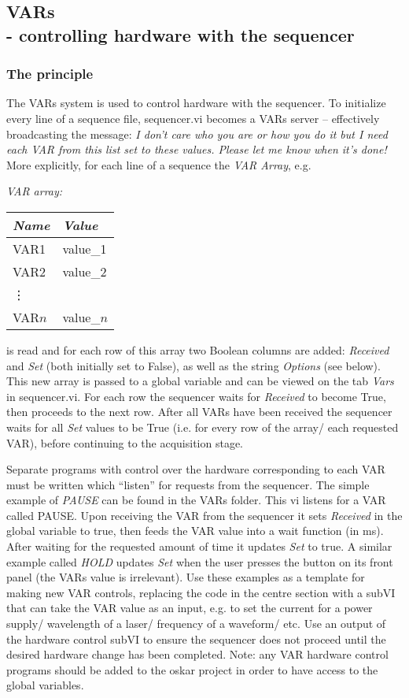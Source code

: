 \documentclass[10pt,a4paper]{article}
\begin{document}
\subsection[VARs]{\label{sex:var}VARs \\ %
	\normalsize - controlling hardware with the sequencer}

\subsubsection{The principle}
The VARs system is used to control hardware with the sequencer.  To initialize every line of a sequence file, sequencer.vi becomes a VARs server -- effectively broadcasting the message: \emph{I don't care who you are or how you do it but I need each VAR from this list set to these values. Please let me know when it's done!}  More explicitly, for each line of a sequence the \emph{VAR Array}, e.g.

\hangindent=0.7cm
\emph{VAR array:} \\
\begin{tabularx}{0.3\textwidth}{X|X}
	\emph{Name} & \emph{Value} \\
	\hline
	VAR1 & value\_1 \\
	VAR2 & value\_2 \\
	\vdots & \\
	VAR$n$ & value\_$n$ \\
\end{tabularx}

\noindent is read and for each row of this array two Boolean columns are added: \emph{Received} and \emph{Set} (both initially set to False), as well as the string \emph{Options} (see below).  This new array is passed to a global variable and can be viewed on the tab \emph{Vars} in sequencer.vi.  For each row the sequencer waits for \emph{Received} to become True, then proceeds to the next row. After all VARs have been received the sequencer waits for all \emph{Set} values to be True (i.e. for every row of the array/ each requested VAR), before continuing to the acquisition stage.

Separate programs with control over the hardware corresponding to each VAR must be written which ``listen'' for requests from the sequencer.  The simple example of \emph{PAUSE} can be found in the VARs folder.  This vi listens for a VAR called PAUSE. Upon receiving the VAR from the sequencer it sets \emph{Received} in the global variable to true, then feeds the VAR value into a wait function (in ms). After waiting for the requested amount of time it updates \emph{Set} to true.  A similar example called \emph{HOLD} updates \emph{Set} when the user presses the button on its front panel (the VARs value is irrelevant). Use these examples as a template for making new VAR controls, replacing the code in the centre section with a subVI that can take the VAR value as an input, e.g. to set the current for a power supply/ wavelength of a  laser/ frequency of a waveform/ etc.  Use an output of the hardware control subVI to ensure the sequencer does not proceed until the desired hardware change has been completed. Note: any VAR hardware control programs should be added to the oskar project in order to have access to the global variables.
\end{document}
